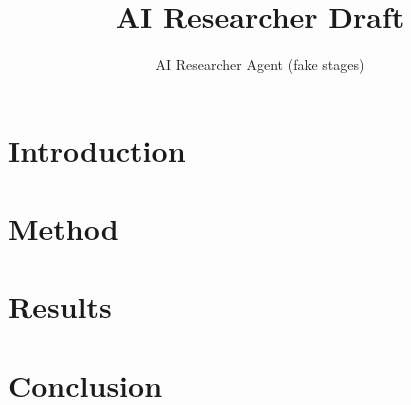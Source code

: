 \documentclass{article}
\title{AI Researcher Draft}
\author{AI Researcher Agent (fake stages)}
\date{}
\begin{document}
\maketitle
\begin{abstract}

\end{abstract}
\section{Introduction}

\section{Method}

\section{Results}

\section{Conclusion}



\end{document}
